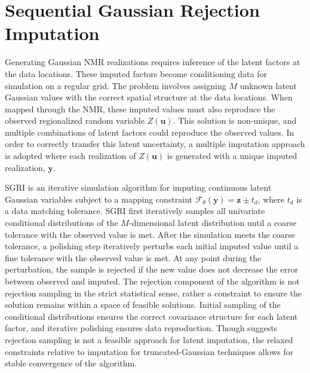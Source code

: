 \FloatBarrier
\section{Sequential Gaussian Rejection Imputation}
\label{sec:sgri}

Generating Gaussian \gls{NMR} realizations requires inference of the latent factors at the data locations. These imputed factors become conditioning data for simulation on a regular grid. The problem involves assigning $M$ unknown latent Gaussian values with the correct spatial structure at the data locations. When mapped through the \gls{NMR}, these imputed values must also reproduce the observed regionalized random variable $Z(\mathbf{u})$. This solution is non-unique, and multiple combinations of latent factors could reproduce the observed values. In order to correctly transfer this latent uncertainty, a multiple imputation \citep{barnett2015multivariate} approach is adopted where each realization of $Z(\mathbf{u})$ is generated with a unique imputed realization, $\mathbf{y}$.

\Gls{SGRI} is an iterative simulation algorithm for imputing continuous latent Gaussian variables subject to a mapping constraint $\mathcal{F}_{\theta}\left(\mathbf{y}\right)=\mathbf{z} \pm t_{d}$, where $t_{d}$ is a data matching tolerance. \Gls{SGRI} first iteratively samples all univariate conditional distributions of the $M$-dimensional latent distribution until a coarse tolerance with the observed value is met. After the simulation meets the coarse tolerance, a polishing step iteratively perturbs each initial imputed value until a fine tolerance with the observed value is met. At any point during the perturbation, the sample is rejected if the new value does not decrease the error between observed and imputed. The rejection component of the algorithm is not rejection sampling in the strict statistical sense, rather a constraint to ensure the solution remains within a space of feasible solutions. Initial sampling of the conditional distributions ensures the correct covariance structure for each latent factor, and iterative polishing ensures data reproduction. Though \cite{armstrong2011plurigaussian} suggests rejection sampling is not a feasible approach for latent imputation, the relaxed constraints relative to imputation for truncated-Gaussian techniques allows for stable convergence of the algorithm.

